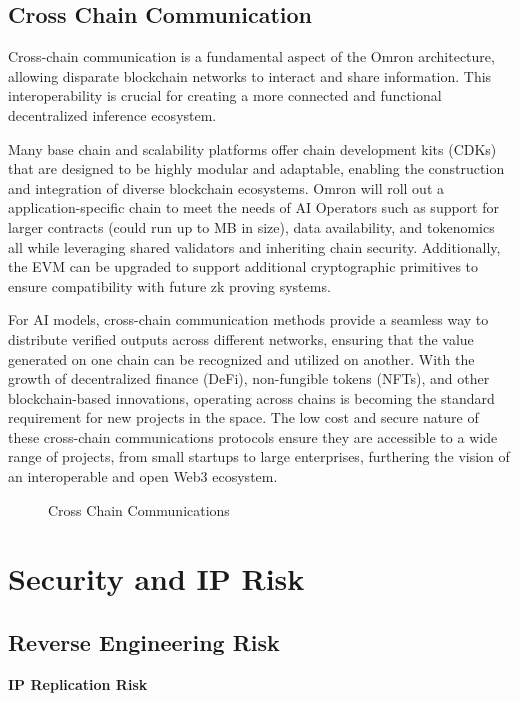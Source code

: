 \documentclass[conference]{IEEEtran}
\begin{document}
\subsection{Cross Chain Communication}
Cross-chain communication is a fundamental aspect of the Omron architecture, allowing disparate blockchain networks to interact and share information. This interoperability is crucial for creating a more connected and functional decentralized inference ecosystem.

Many base chain and scalability platforms offer chain development kits (CDKs) that are designed to be highly modular and adaptable, enabling the construction and integration of diverse blockchain ecosystems.  Omron will roll out a application-specific chain to meet the needs of AI Operators such as support for larger contracts (could run up to MB in size), data availability, and tokenomics all while leveraging shared validators and inheriting chain security. Additionally, the EVM can be upgraded to support additional cryptographic primitives to ensure compatibility with future zk proving systems. 

For AI models, cross-chain communication methods provide a seamless way to distribute verified outputs across different networks, ensuring that the value generated on one chain can be recognized and utilized on another. With the growth of decentralized finance (DeFi), non-fungible tokens (NFTs), and other blockchain-based innovations, operating across chains is becoming the standard requirement for new projects in the space. The low cost and secure nature of these cross-chain communications protocols ensure they are accessible to a wide range of projects, from small startups to large enterprises, furthering the vision of an interoperable and open Web3 ecosystem.

\begin{figure}[!ht]
    \centering
    
    \caption{Cross Chain Communications}
    \label{fig:Fig 9}
\end{figure}
\newpage

\section{Security and IP Risk}
\subsection{Reverse Engineering Risk}
\noindent \textbf{IP Replication Risk}
\end{document}
